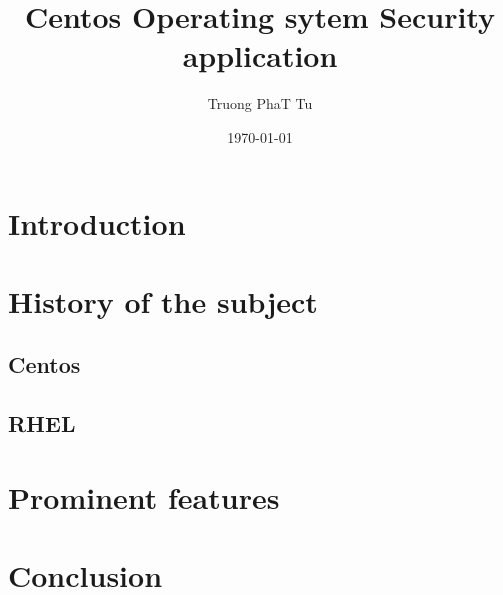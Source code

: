 \documentclass[10pt]{article}
\title{Centos Operating sytem Security application}
\author{Truong PhaT Tu}
\affil{
Luther College\\
Decorah, IA 52101\\
tuph01@luther.edu
}
\date{\today}
\begin{document}


\maketitle

\tableofcontents

\section{Introduction}

\section{History of the subject}
\subsection{Centos}
\cite{CentosAbout}

\subsection{RHEL}
\section{Prominent features}
\cite{SEiRHEL}
\cite{ALSHHfRtAR_SCAP_C}
\cite{RHEL9Sh}
\cite{FoCL}

\section{Conclusion}

\printbibliography
\end{document}
